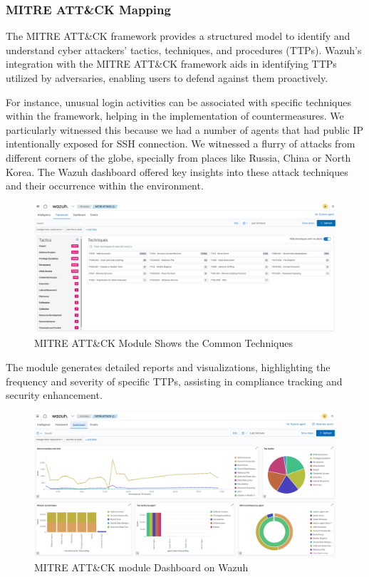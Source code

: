 \subsubsection{MITRE ATT\&CK Mapping}

The MITRE ATT\&CK framework provides a structured model to identify and understand cyber attackers' tactics, techniques, and procedures (TTPs). Wazuh's integration with the MITRE ATT\&CK framework aids in identifying TTPs utilized by adversaries, enabling users to defend against them proactively.

For instance, unusual login activities can be associated with specific techniques within the framework, helping in the implementation of countermeasures. We particularly witnessed this because we had a number of agents that had public IP intentionally exposed for SSH connection. We witnessed a flurry of attacks from different corners of the globe, specially from places like Russia, China or North Korea. The Wazuh dashboard offered key insights into these attack techniques and their occurrence within the environment.

\begin{figure}[H]
    \centering
    \includegraphics[width=\textwidth]{images/threat-hunting/mitre-techniques.png}
    \caption{MITRE ATT\&CK Module Shows the Common Techniques}
    \label{fig:mitre-attack-techniques}
\end{figure}

The module generates detailed reports and visualizations, highlighting the frequency and severity of specific TTPs, assisting in compliance tracking and security enhancement.

\begin{figure}[H]
    \centering
    \includegraphics[width=\textwidth]{images/threat-hunting/mitre-dashboard.png}
    \caption{MITRE ATT\&CK module Dashboard on Wazuh}
    \label{fig:mitre-attack-dashboard}
\end{figure}


